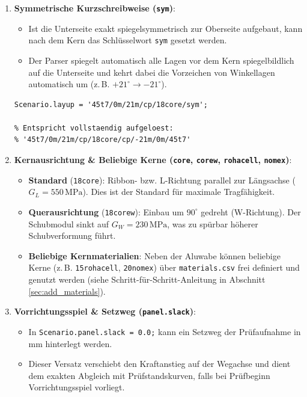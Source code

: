 \begin{enumerate}
    \item \textbf{Symmetrische Kurzschreibweise (\texttt{sym})}:
    \begin{itemize}
        \item Ist die Unterseite exakt spiegelsymmetrisch zur Oberseite aufgebaut, kann nach dem Kern das Schlüsselwort \texttt{sym} gesetzt werden.
        \item Der Parser spiegelt automatisch alle Lagen vor dem Kern spiegelbildlich auf die Unterseite und kehrt dabei die Vorzeichen von Winkellagen automatisch um (z.\,B. $+21^\circ \to -21^\circ$).
    \end{itemize}
\begin{lstlisting}[style=vscodeLightMatlab]
% Kompakte symmetrische Notation:
Scenario.layup = '45t7/0m/21m/cp/18core/sym';

% Entspricht vollstaendig aufgeloest:
% '45t7/0m/21m/cp/18core/cp/-21m/0m/45t7'
\end{lstlisting}

    \item \textbf{Kernausrichtung \& Beliebige Kerne (\texttt{core}, \texttt{corew}, \texttt{rohacell}, \texttt{nomex})}:
    \begin{itemize}
        \item \textbf{Standard} (\texttt{18core}): Ribbon- bzw. L-Richtung parallel zur Längsachse ($G_L = 550\,\text{MPa}$). Dies ist der Standard für maximale Tragfähigkeit.
        \item \textbf{Querausrichtung} (\texttt{18corew}): Einbau um $90^\circ$ gedreht (W-Richtung). Der Schubmodul sinkt auf $G_W = 230\,\text{MPa}$, was zu spürbar höherer Schubverformung führt.
        \item \textbf{Beliebige Kernmaterialien}: Neben der Aluwabe können beliebige Kerne (z.\,B. \texttt{15rohacell}, \texttt{20nomex}) über \texttt{materials.csv} frei definiert und genutzt werden (siehe Schritt-für-Schritt-Anleitung in Abschnitt \ref{sec:add_materials}).
    \end{itemize}

    \item \textbf{Vorrichtungsspiel \& Setzweg (\texttt{panel.slack})}:
    \begin{itemize}
        \item In \texttt{Scenario.panel.slack = 0.0;} kann ein Setzweg der Prüfaufnahme in $\text{mm}$ hinterlegt werden.
        \item Dieser Versatz verschiebt den Kraftanstieg auf der Wegachse und dient dem exakten Abgleich mit Prüfstandskurven, falls bei Prüfbeginn Vorrichtungsspiel vorliegt.
    \end{itemize}


\end{enumerate}
